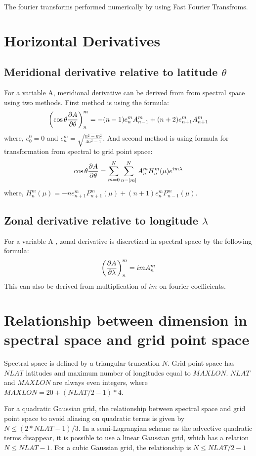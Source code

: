 \documentclass{SBCbookchapter}
\begin{document}
The fourier transforms performed numerically by using Fast Fourier Transfroms.

\section{Horizontal Derivatives}
\subsection{Meridional derivative relative to latitude $\theta$ }
For a variable A, meridional derivative can be derived from from spectral space using two methods. First method is using the formula:
\begin{equation}
\left(\cos\theta\pdv{A}{\theta}\right)_{n}^m = -(n-1)e_{n}^m A_{n-1}^m + 
(n+2)e_{n+1}^m A_{n+1}^m
\end{equation}
where, $e_0^0=0$ and $e_n^m = \sqrt{\frac{n^2-m^2}{4n^2-1}}$. And second method is using formula for transformation from spectral to grid point space:
\begin{equation}
\cos\theta\pdv{A}{\theta} = \sum_{m=0}^{N} \sum_{n=|m|}^{N} A_{n}^{m} H_{n}^{m} (\mu) e^{im\lambda}
\end{equation}
where, $H_n^m(\mu) = -ne_{n+1}^m P_{n+1}^m(\mu) + (n+1)e_n^m P_{n-1}^m(\mu)$.

\subsection{Zonal derivative relative to longitude $\lambda$}
For a variable A , zonal derivative is discretized in spectral space by the
following formula:
\begin{equation}
\left(\pdv{A}{\lambda}\right)_n^m = imA_n^m
\end{equation}
This can also be derived from multiplication of $im$ on fourier coefficients.

\section{Relationship between dimension in spectral space and grid point space}
Spectral space is defined by a triangular truncation $N$. Grid point space has $NLAT$ latitudes and maximum number of longitudes equal to $MAXLON$. $NLAT$ and $MAXLON$ are always even integers, where $MAXLON=20+(NLAT/2-1)*4$.

For a quadratic Gaussian grid, the relationship between spectral space and grid point space to avoid aliasing on quadratic terms is given by $N \leq (2*NLAT-1)/3$.
In a semi-Lagrangian scheme as the advective quadratic terms disappear, it is possible to use a linear Gaussian grid, which has a relation $N \leq NLAT-1$.
For a cubic Gaussian grid, the relationship is $N \leq NLAT/2 -1 $
\end{document}
